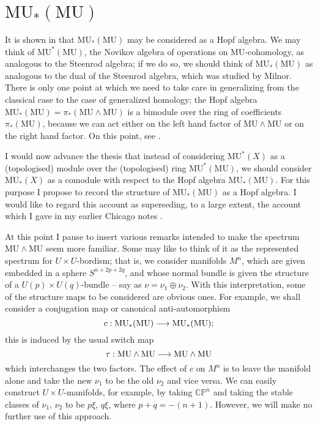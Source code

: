 \documentclass[../main]{subfiles}
\begin{document}
\label{sec:p2c11}
\chapter{$\mathrm{MU}_\ast(\mathrm{MU})$}
It is shown in \cite[Lecture 3, pp.~56-76]{adams3} that $\mathrm{MU}_\ast(\mathrm{MU})$ may be considered as a Hopf algebra. We may think of $\mathrm{MU}^\ast(\mathrm {MU})$, the Novikov algebra of operations on MU-cohomology, as analogous to the Steenrod algebra; if we do so, we should think of $\mathrm{MU}_\ast(\mathrm {MU})$ as analogous to the dual of the Steenrod algebra, which was studied by Milnor. \cite{milnor} There is only one point at which we need to take care in generalizing from the classical case to the case of generalized homology; the Hopf algebra $\mathrm{MU}_\ast(\mathrm {MU}) = \pi_\ast(\mathrm{MU} \wedge \mathrm{MU})$ is a bimodule over the ring of coefficients $\pi_\ast(\mathrm{MU})$, because we can act either on the left hand factor of $\mathrm{MU} \wedge \mathrm{MU}$ or on the right hand factor. On this point, see \cite[Lecture 3, pp.~59-60]{adams3}.

I would now advance the thesis that instead of considering $\mathrm{MU}^\ast(X)$ as a (topologised) module over the (topologised) ring $\mathrm {MU}^\ast(\mathrm{MU})$, we should consider $\mathrm{MU}_\ast(X)$ as a comodule with respect to the Hopf algebra $\mathrm{MU}_\ast(\mathrm{MU})$. For this purpose I propose to record the structure of $\mathrm{MU}_\ast(\mathrm{MU})$ as a Hopf algebra. I would like to regard this account as superseding, to a large extent, the account which I gave in my earlier Chicago notes \cite{adams2}.

At this point I pause to insert various remarks intended to make the spectrum $\mathrm{MU} \wedge \mathrm{MU}$ seem more familiar. Some may like to think of it as the represented spectrum for $U \times U$-bordism; that is, we consider manifolds $M^n$, which are given embedded in a sphere $S^{n + 2p + 2q}$, and whose normal bundle is given the structure of a $U(p) \times U(q)$-bundle -- say as $\nu = \nu_1 \oplus \nu_2$. With this interpretation, some of the structure maps to be considered are obvious ones. For example, we shall consider a conjugation map or canonical anti-automorphism
$$c: \mathrm{MU}_\ast(\mathrm{MU}) \overset{}{\longrightarrow} \mathrm{MU}_\ast(\mathrm{MU});$$
this is induced by the usual switch map
$$\tau : \mathrm{MU} \wedge \mathrm{MU} \overset{}{\longrightarrow} \mathrm{MU} \wedge \mathrm{MU}$$
which interchanges the two factors. The effect of $c$ on $M^n$ is to leave the manifold alone and take the new $\nu_1$ to be the old $\nu_2$ and vice versa. We can easily construct $U \times U$-manifolds, for example, by taking $\mathbb {CP}^n$ and taking the stable classes of $\nu_1$, $\nu_2$ to be $p \xi$, $q \xi$, where $p + q = -(n + 1)$. However, we will make no further use of this approach. 
\end{document}
